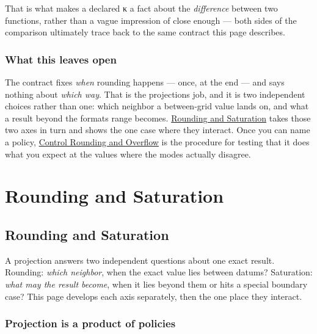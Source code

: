 That is what makes a declared κ a fact about the \emph{difference} between two functions, rather than a vague impression of {\textquotedbl}close enough{\textquotedbl} — both sides of the comparison ultimately trace back to the same contract this page describes.



\subsection{What this leaves open}



\label{15263504601444045058-dup2}{}


The contract fixes \emph{when} rounding happens — once, at the end — and says nothing about \emph{which way}. That is the projection{\textquotesingle}s job, and it is two independent choices rather than one: which neighbor a between-grid value lands on, and what a result beyond the format{\textquotesingle}s range becomes. \href{concept\_\allowbreak{}rounding\_\allowbreak{}saturation.md}{Rounding and Saturation} takes those two axes in turn and shows the one case where they interact. Once you can name a policy, \href{workflow\_\allowbreak{}rounding\_\allowbreak{}overflow.md}{Control Rounding and Overflow} is the procedure for testing that it does what you expect at the values where the modes actually disagree.



\chapter{Rounding and Saturation}


\section{Rounding and Saturation}



\label{9659117012880001312}{}


A projection answers two independent questions about one exact result. Rounding: \emph{which neighbor}, when the exact value lies between datums? Saturation: \emph{what may the result become}, when it lies beyond them or hits a special boundary case? This page develops each axis separately, then the one place they interact.



\subsection{Projection is a product of policies}



